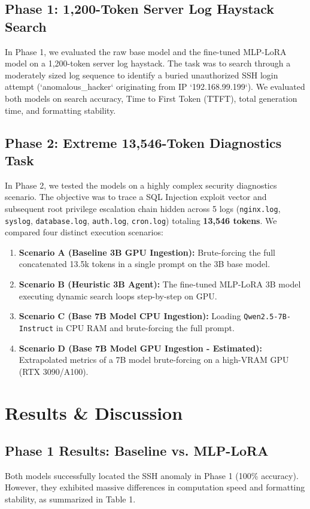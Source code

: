 \documentclass[10pt,twocolumn]{article}
\begin{document}
\subsection{Phase 1: 1,200-Token Server Log Haystack Search}
In Phase 1, we evaluated the raw base model and the fine-tuned MLP-LoRA model on a 1,200-token server log haystack. The task was to search through a moderately sized log sequence to identify a buried unauthorized SSH login attempt (`anomalous\_hacker` originating from IP `192.168.99.199`). We evaluated both models on search accuracy, Time to First Token (TTFT), total generation time, and formatting stability.

\subsection{Phase 2: Extreme 13,546-Token Diagnostics Task}
In Phase 2, we tested the models on a highly complex security diagnostics scenario. The objective was to trace a SQL Injection exploit vector and subsequent root privilege escalation chain hidden across 5 logs (\texttt{nginx.log}, \texttt{syslog}, \texttt{database.log}, \texttt{auth.log}, \texttt{cron.log}) totaling \textbf{13,546 tokens}. We compared four distinct execution scenarios:
\begin{enumerate}
    \item \textbf{Scenario A (Baseline 3B GPU Ingestion):} Brute-forcing the full concatenated 13.5k tokens in a single prompt on the 3B base model.
    \item \textbf{Scenario B (Heuristic 3B Agent):} The fine-tuned MLP-LoRA 3B model executing dynamic search loops step-by-step on GPU.
    \item \textbf{Scenario C (Base 7B Model CPU Ingestion):} Loading \texttt{Qwen2.5-7B-Instruct} in CPU RAM and brute-forcing the full prompt.
    \item \textbf{Scenario D (Base 7B Model GPU Ingestion - Estimated):} Extrapolated metrics of a 7B model brute-forcing on a high-VRAM GPU (RTX 3090/A100).
\end{enumerate}

\section{Results \& Discussion}

\subsection{Phase 1 Results: Baseline vs. MLP-LoRA}
Both models successfully located the SSH anomaly in Phase 1 (100\% accuracy). However, they exhibited massive differences in computation speed and formatting stability, as summarized in Table 1.
\end{document}
